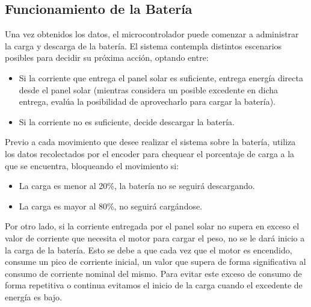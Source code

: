         \subsection{Funcionamiento de la Batería}
            Una vez obtenidos los datos, el microcontrolador puede comenzar a administrar la carga y descarga de la batería. El sistema contempla distintos escenarios posibles para decidir su próxima acción, optando entre:\par
            
            \begin{itemize} [label=•]
                \setlength{\itemindent}{1.5em}
                
                \item Si la corriente que entrega el panel solar es suficiente, entrega energía directa desde el panel solar (mientras considera un posible excedente en dicha entrega, evalúa la posibilidad de aprovecharlo para cargar la batería).
                \item Si la corriente no es suficiente, decide descargar la batería.
            \end{itemize}
            
            Previo a cada movimiento que desee realizar el sistema sobre la batería, utiliza los datos recolectados por el encoder para chequear el porcentaje de carga a la que se encuentra, bloqueando el movimiento si:\par
            
            \begin{itemize} [label=•]
                \setlength{\itemindent}{1.5em}
                
                \item La carga es menor al 20\%, la batería no se seguirá descargando.
                \item La carga es mayor al 80\%, no seguirá cargándose.
            \end{itemize}
            
            Por otro lado, si la corriente entregada por el panel solar no supera en exceso el valor de corriente que necesita el motor para cargar el peso, no se le dará inicio a la carga de la batería. Esto se debe a que cada vez que el motor es encendido, consume un pico de corriente inicial, un valor que supera de forma significativa al consumo de corriente nominal del mismo. Para evitar este exceso de consumo de forma repetitiva o continua evitamos el inicio de la carga cuando el excedente de energía es bajo.\par
